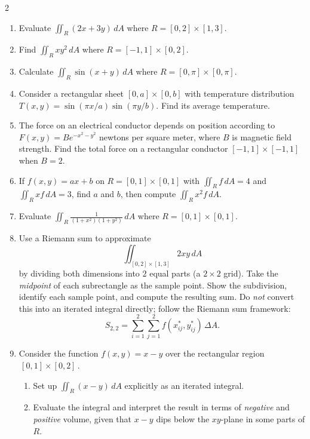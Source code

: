 \begin{multicols}{2}

\begin{enumerate}

\item Evaluate \(\displaystyle\iint_R (2x + 3y)\,dA\) where \(R = [0,2] \times [1,3]\).

\item Find \(\displaystyle\iint_R xy^2\,dA\) where \(R = [-1,1] \times [0,2]\).


\item Calculate \(\displaystyle\iint_R \sin(x+y)\,dA\) where \(R = [0,\pi] \times [0,\pi]\).

\item Consider a rectangular sheet \([0,a] \times [0,b]\) with temperature distribution \(T(x,y) = \sin(\pi x/a)\sin(\pi y/b)\). Find its average temperature.

\item The force on an electrical conductor depends on position according to \(F(x,y) = Be^{-x^2-y^2}\) newtons per square meter, where \(B\) is magnetic field strength. Find the total force on a rectangular conductor \([-1,1] \times [-1,1]\) when \(B = 2\).

\item If \( f(x,y) = ax + b \) on \( R = [0,1] \times [0,1] \) with \( \iint_R f \, dA = 4 \) and \( \iint_R x f \, dA = 3 \), find \( a \) and \( b \), then compute \( \iint_R x^2 f \, dA \).

\item Evaluate \(\displaystyle\iint_R \frac{1}{(1+x^2)(1+y^2)}\,dA\) where \(R = [0,1] \times [0,1]\).

\item 
Use a Riemann sum to approximate
\[
\iint_{[0,2]\times[1,3]} 2x y \, dA
\]
by dividing both dimensions into \(2\) equal parts (a \(2 \times 2\) grid). Take the \emph{midpoint} of each subrectangle as the sample point. Show the subdivision, identify each sample point, and compute the resulting sum. Do \emph{not} convert this into an iterated integral directly; follow the Riemann sum framework:
\[
S_{2,2} = \sum_{i=1}^2 \sum_{j=1}^2 f(x_{ij}^*, y_{ij}^*)\,\Delta A.
\]

\item 
Consider the function \(f(x,y) = x - y\) over the rectangular region \(\,[0,1]\times[0,2]\,.\)
\begin{enumerate}
   \item Set up \(\iint_R (x - y)\,dA\) explicitly as an iterated integral.
   \item Evaluate the integral and interpret the result in terms of \emph{negative} and \emph{positive} volume, given that \(x-y\) dips below the \(xy\)-plane in some parts of \(R\).
\end{enumerate}


\end{enumerate}
\end{multicols}
